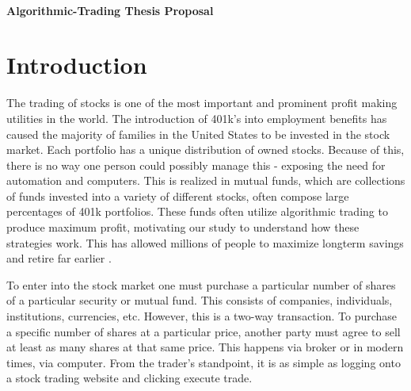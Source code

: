 \documentclass[letterpaper,11pt]{article}
\begin{document}
\thispagestyle{plain}


 \\

\noindent\textbf{Algorithmic-Trading Thesis Proposal}

\section{Introduction}

The trading of stocks is one of the most important and prominent profit making utilities in the world. The introduction of 401k's into employment benefits has caused the majority of families in the United States to be invested in the stock market. Each portfolio has a unique distribution of owned stocks. Because of this, there is no way one person could possibly manage this - exposing the need for automation and computers. This is realized in mutual funds, which are collections of funds invested into a variety of different stocks, often compose large percentages of 401k portfolios. These funds often utilize algorithmic trading to produce maximum profit, motivating our study to understand how these strategies work. This has allowed millions of people to maximize longterm savings and retire far earlier \cite{Treleaven2013}.

To enter into the stock market one must purchase a particular number of shares of a particular security or mutual fund. This consists of companies, individuals, institutions, currencies, etc. However, this is a two-way transaction. To purchase a specific number of shares at a particular price, another party must agree to sell at least as many shares at that same price. This happens via broker or in modern times, via computer. From the trader's standpoint, it is as simple as logging onto a stock trading website and clicking execute trade. 
\end{document}
